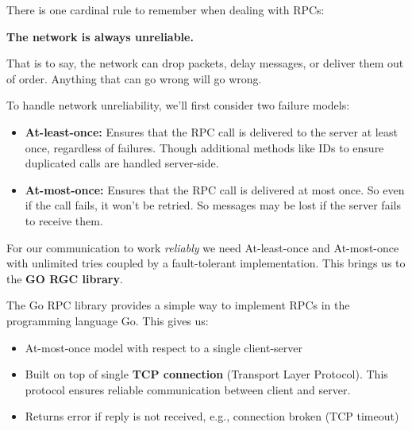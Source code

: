 \noindent
There is one cardinal rule to remember when dealing with RPCs:
\begin{theo}

    \begin{center}
        \Large{\textbf{The network is always unreliable.}}
    \end{center}

    \vspace{1em}

    \noindent
    That is to say, the network can drop packets, delay messages, or deliver them out of order. Anything that 
    can go wrong will go wrong.
\end{theo}

\noindent
To handle network unreliability, we'll first consider two failure models:

\begin{Def}

    \begin{itemize}
        \item \textbf{At-least-once:} Ensures that the RPC call is delivered to the server at least once, regardless of failures. Though additional methods like IDs to ensure duplicated calls are handled server-side.
        \item \textbf{At-most-once:} Ensures that the RPC call is delivered at most once. So even if the call fails, it won't be retried. So messages may be lost if the server fails to receive them.
    \end{itemize}
\end{Def}

\newpage

\noindent
For our communication to work \textit{reliably} we need At-least-once and At-most-once with unlimited tries coupled by 
a fault-tolerant implementation. This brings us to the \textbf{GO RGC library}.

\begin{Def}

    The Go RPC library provides a simple way to implement RPCs in the programming language Go. This gives us:
    \begin{itemize}
        \item At-most-once model with respect to a single
        client-server
        \item Built on top of single \textbf{TCP connection} (Transport Layer Protocol). This protocol ensures reliable communication between client and server.
        \item Returns error if reply is not received, e.g.,
        connection broken (TCP timeout)
    \end{itemize}
\end{Def}

